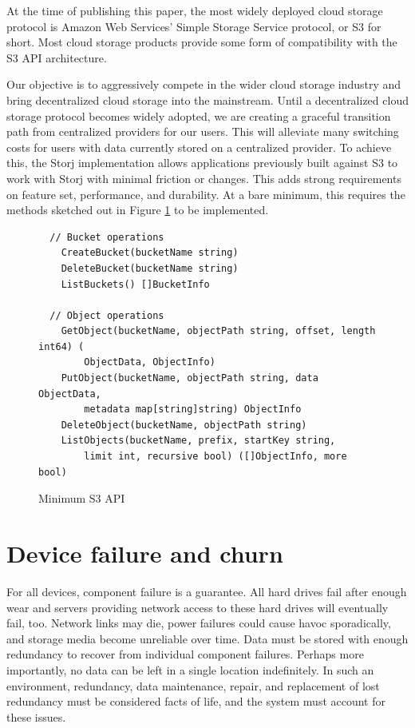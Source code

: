 \documentclass[11pt,fleqn,openany]{book}
\begin{document}
At the time of publishing this paper, the most widely deployed cloud storage
protocol is Amazon Web Services' Simple Storage Service protocol, or S3 for
short. Most cloud storage products provide some form of compatibility with the
S3 API architecture.

Our objective is to aggressively compete in the wider cloud
storage industry and bring decentralized cloud storage into the mainstream.
Until a decentralized cloud storage protocol becomes widely adopted,
we are creating a graceful transition path from centralized
providers for our users.
This will alleviate many switching costs for users with data currently stored on
a centralized provider.
To achieve this, the Storj implementation allows
applications previously built against S3 to work with Storj with
minimal friction or changes.
This adds strong requirements on feature set, performance, and durability.
At a bare minimum, this requires the methods sketched out in
Figure \ref{fig:s3-api-code} to be implemented.

\begin{figure}
\begin{lstlisting}
  // Bucket operations
	CreateBucket(bucketName string)
	DeleteBucket(bucketName string)
	ListBuckets() []BucketInfo

  // Object operations
	GetObject(bucketName, objectPath string, offset, length int64) (
	    ObjectData, ObjectInfo)
	PutObject(bucketName, objectPath string, data ObjectData,
	    metadata map[string]string) ObjectInfo
	DeleteObject(bucketName, objectPath string)
	ListObjects(bucketName, prefix, startKey string,
	    limit int, recursive bool) ([]ObjectInfo, more bool)
\end{lstlisting}
\caption{Minimum S3 API}
\label{fig:s3-api-code}
\end{figure}

\section{Device failure and churn}

For all devices, component failure is a guarantee.
All hard drives fail after enough wear
\cite{backblaze-hd-2018-q1} and servers providing network access to
these hard drives will eventually fail, too. Network links may die, power
failures could cause havoc sporadically,
and storage media become unreliable over time.
Data must be stored with enough redundancy to recover from
individual component failures.
Perhaps more importantly, no data can be left in a single location
indefinitely. In such an environment, redundancy, data
maintenance, repair, and replacement of lost redundancy must be considered
facts of life, and the system must account for these issues.
\end{document}
